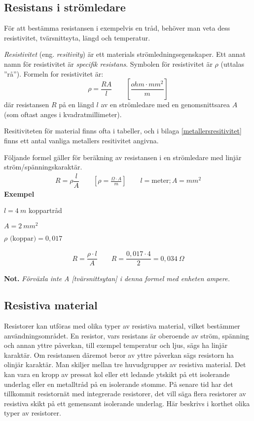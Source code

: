 \subsection{Resistans i strömledare}

För att bestämma resistansen i exempelvis en tråd, behöver man veta dess 
resistivitet, tvärsnittsyta, längd och temperatur.

\emph{Resistivitet} (eng. \emph{resitivity}) är ett materials
strömledningsegenskaper.
Ett annat namn för resistivitet är \emph{specifik resistans}.
Symbolen för resistivitet är \(\rho\) (uttalas ''rå'').
Formeln for resistivitet är:
\[\rho = \dfrac{R A}{l}\qquad \left[\dfrac{ohm \cdot mm^2}{m}\right]\]
där resistansen \(R\) på en längd \(l\) av en strömledare med en
genomsnittsarea \(A\) (som oftast anges i kvadratmillimeter).

Resitiviteten för material finns ofta i tabeller, och i bilaga
\ref{metallersresitivitet} finns ett antal vanliga metallers resitivitet
angivna.

Följande formel gäller för beräkning av resistansen i en strömledare med
linjär ström/spänningskaraktär.
\[\begin{array}{c}
    R = \rho \dfrac{l}{A} \qquad \left[\rho = \frac{\Omega \cdot A}{m} \right] \qquad l=\text{meter}; A=mm^2
\end{array}\]
\noindent
\textbf{Exempel}

\(l = 4\ m\) koppartråd

\(A = 2\ mm^2\)

\(\rho \text{ (koppar)} = 0,017\)

\[\begin{array}{c}
R = \dfrac{\rho \cdot l}{A} \qquad R = \dfrac{0,017 \cdot 4}{2} = 0,034\ \Omega
\end{array}\]

\noindent
\textbf{Not.} \emph{Förväxla inte A [tvärsnittsytan] i denna formel med enheten ampere.}

\subsection{Resistiva material}

Resistorer kan utföras med olika typer av resistiva material, vilket bestämmer
användningsområdet. En resistor, vars resistans är oberoende av ström, spänning
och annan yttre påverkan, till exempel temperatur och ljus, sägs ha linjär karaktär.
Om resistansen däremot beror av yttre påverkan sägs resistorn ha olinjär
karaktär. Man skiljer mellan tre huvudgrupper av resistiva material. Det kan
vara en kropp av pressat kol eller ett ledande ytskikt på ett isolerande
underlag eller en metalltråd på en isolerande stomme. På senare tid har det
tillkommit resistornät med integrerade resistorer, det vill säga flera resistorer av
resistiva skikt på ett gemensamt isolerande underlag. Här beskrivs i korthet
olika typer av resistorer.

